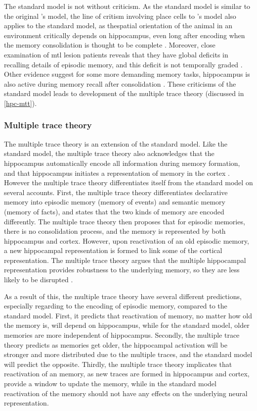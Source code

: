 The standard model is not without criticism. As the standard model is similar to the original \citet{marr71}'s model, the line of critism involving place cells to \citet{marr71}'s model also applies to the standard model, as thespatial orientation of the animal in an environment critically depends on hippocampus, even long after encoding when the memory consolidation is thought to be complete \citet[e.g.][]{mumby99, sutherland01, clark05}. Moreover, close examination of \gls{mtl} lesion patients reveals that they have global deficits in recalling details of episodic memory, and this deficit is not temporally graded \citep{cipolotti01, viskontas02}. Other evidence suggest for some more demanding memory tasks, hippocampus is also active during memory recall after consolidation \citep{ryan01, wheeler13}. These criticisms of the standard model leads to development of the multiple trace theory (discussed in \ref{hpc-mtt}).

\subsubsection{Multiple trace theory \label{hpc-mtt}}
The multiple trace theory is an extension of the standard model. Like the standard model, the multiple trace theory also acknowledges that the hippocampus automatically encode all information during memory formation, and that hippocampus initiates a representation of memory in the cortex \citep{nadel97}. However the multiple trace theory differentiates itself from the standard model on several accounts. First, the multiple trace theory differentiates declarative memory into episodic memory (memory of events) and semantic memory (memory of facts), and states that the two kinds of memory are encoded differently. The multiple trace theory then proposes that for episodic memories, there is no consolidation process, and the memory is represented by both hippocampus and cortex. However, upon reactivation of an old episodic memory, a new hippocampal representation is formed to link some of the cortical representation. The multiple trace theory argues that the multiple hippocampal representation provides robustness to the underlying memory, so they are less likely to be disrupted \citep{nadel97}. 

As a result of this, the multiple trace theory have several different predictions, especially regarding to the encoding of episodic memory, compared to the standard model. First, it predicts that reactivation of memory, no matter how old the memory is, will depend on hippocampus, while for the standard model, older memories are more independent of hippocampus. Secondly, the multiple trace theory predicts as memories get older, the hippocampal activation will be stronger and more distributed due to the multiple traces, and the standard model will predict the opposite. Thirdly, the multiple trace theory implicates that reactivation of an memory, as new traces are formed in hippocampus and cortex, provide a window to update the memory, while in the standard model reactivation of the memory should not have any effects on the underlying neural representation. 


